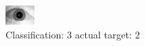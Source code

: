 \begin{figure}[h!]
\begin{center}
\includegraphics[width=0.60\columnwidth]{figures/ID1726_class_3_target_2.png}
\end{center}
\caption{ Classification: 3 actual target: 2}
\label{fig:ID1726_class_3_target_2}
\end{figure}
